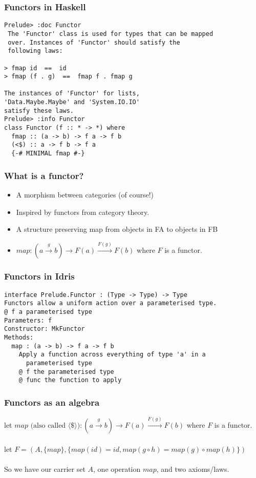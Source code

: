 \documentclass[hyperref={colorlinks = true,linkcolor = blue, citecolor = blue, urlcolor = blue}]{beamer}
\begin{document}
\begin{frame}[fragile]
  \frametitle{Functors in Haskell}
  \begin{verbatim}
Prelude> :doc Functor
 The 'Functor' class is used for types that can be mapped 
 over. Instances of 'Functor' should satisfy the 
 following laws:

> fmap id  ==  id
> fmap (f . g)  ==  fmap f . fmap g

The instances of 'Functor' for lists, 
'Data.Maybe.Maybe' and 'System.IO.IO'
satisfy these laws.
Prelude> :info Functor
class Functor (f :: * -> *) where
  fmap :: (a -> b) -> f a -> f b
  (<$) :: a -> f b -> f a
  {-# MINIMAL fmap #-}
  \end{verbatim}
\end{frame}

\begin{frame}[fragile]
  \frametitle{What is a functor?}
  \begin{itemize}
  \item A morphism between categories (of course!)
  \item Inspired by functors from category theory.
  \item A structure preserving map from objects in FA to objects in FB
  \item $map : (a \overset{g}{\rightarrow} b) \rightarrow F(a) 
         \overset{F(g)}{\rightarrow} F(b)$ where $F$ is a functor.
  \end{itemize}
\end{frame}

\begin{frame}[fragile]
  \frametitle{Functors in Idris}
  \begin{verbatim}
interface Prelude.Functor : (Type -> Type) -> Type
Functors allow a uniform action over a parameterised type.
@ f a parameterised type
Parameters: f
Constructor: MkFunctor
Methods:
  map : (a -> b) -> f a -> f b
    Apply a function across everything of type 'a' in a 
      parameterised type
    @ f the parameterised type
    @ func the function to apply
  \end{verbatim}
\end{frame}

\begin{frame}[fragile]
  \frametitle{Functors as an algebra}
  let $map \text{ (also called $\langle \$ \rangle$)}: (a \overset{g}{\rightarrow} b) \rightarrow F(a) 
         \overset{F(g)}{\rightarrow} F(b)$ where $F$ is a functor. \\ \\
  let $F= (A, \{map\}, \{map(id) = id, map(g \circ h) = map(g) \circ map(h)\})$ \\
  \\
  So we have our carrier set $A$, one operation $map$, and two axioms/laws.

\end{frame}
\end{document}
